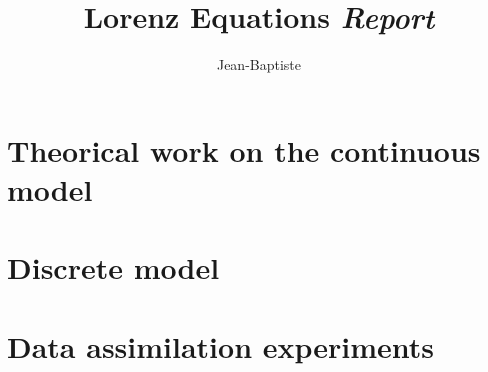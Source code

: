 \documentclass[11pt,a4paper]{article}
\title{
      \bsc{TP Inverse Methods}
      \vskip 1cm
      {\colorb\textbf{Lorenz Equations}}
      \vskip 1cm
      \colorb\textit{Report}
  }
\author{%
    Jean-Baptiste \bsc{Keck}
    \vskip 0.5cm
    \bsc{M2 Msiam}
}
\makeatletter
\newcommand{\colora}{\color{Blue}}
\def\maketitle{%
    \begin{flushleft}
        \normalfont\LARGE\par
    \end{flushleft}
    \vskip 3cm
    \begin{center}%
        {\colora\specialrule{.2em}{0em}{0em}}
        \vskip 1cm
        {\Huge \@title}%
        \vskip 1cm
        {\colora\specialrule{.2em}{0em}{0em}}
        \vskip 5cm
        {\Huge \@author\par}%
        \vskip 2cm
        {\Huge \@date\par}%
        \vskip 1cm

    \end{center}%
    \clearpage
}
\makeatother
\begin{document}
\pagestyle{fancy}

\maketitle


\section{Theorical work on the continuous model}
\section{Discrete model}
\section{Data assimilation experiments}
\end{document}
